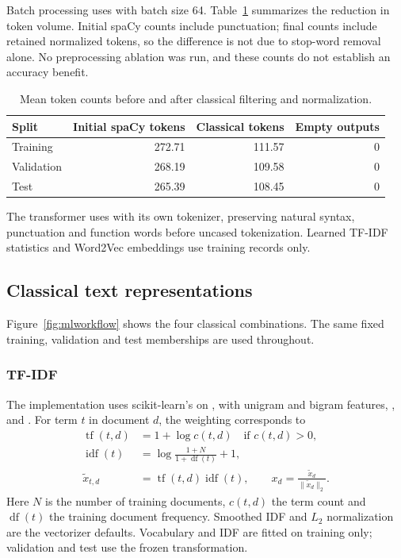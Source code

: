 Batch processing uses  with batch size 64. Table~\ref{tab:tokens}
summarizes the reduction in token volume. Initial spaCy counts include punctuation;
final counts include retained normalized tokens, so the difference is not due
to stop-word removal alone. No preprocessing ablation was run, and these counts
do not establish an accuracy benefit.

\begin{table}[htbp]\centering
\caption{Mean token counts before and after classical filtering and normalization.}\label{tab:tokens}
\begin{tabular}{lrrr}\toprule
Split & Initial spaCy tokens & Classical tokens & Empty outputs\\\midrule
Training & 272.71 & 111.57 & 0\\
Validation & 268.19 & 109.58 & 0\\
Test & 265.39 & 108.45 & 0\\\bottomrule
\end{tabular}
\end{table}
The transformer uses  with its own tokenizer, preserving natural
syntax, punctuation and function words before uncased tokenization. Learned
TF-IDF statistics and Word2Vec embeddings use training records only.

\subsection{Classical text representations}
Figure~\ref{fig:mlworkflow} shows the four classical combinations. The same fixed
training, validation and test memberships are used throughout.

\subsubsection{TF-IDF}
The implementation uses scikit-learn's  on
, with unigram and bigram features,
,  and .
For term $t$ in document $d$, the weighting corresponds to
\begin{align}
 \operatorname{tf}(t,d)&=1+\log c(t,d)\quad\text{if }c(t,d)>0,\\
 \operatorname{idf}(t)&=\log\frac{1+N}{1+\operatorname{df}(t)}+1,\\
 \widetilde{x}_{t,d}&=\operatorname{tf}(t,d)\operatorname{idf}(t),\qquad
 x_d=\frac{\widetilde{x}_d}{\|\widetilde{x}_d\|_2}.
\end{align}
Here $N$ is the number of training documents, $c(t,d)$ the term count and
$\operatorname{df}(t)$ the training document frequency. Smoothed IDF and
$L_2$ normalization are the vectorizer defaults. Vocabulary and IDF are fitted
on training only; validation and test use the frozen transformation.

